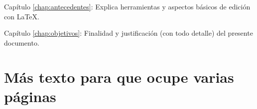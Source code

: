 \begin{definitionlist}
\item[Capítulo \ref{chap:antecedentes}: \nameref{chap:antecedentes}] Explica herramientas
  y aspectos básicos de edición con \LaTeX.
\item[Capítulo \ref{chap:objetivos}: \nameref{chap:objetivos}] Finalidad y justificación
  (con todo detalle) del presente documento.
\end{definitionlist}


\section{Más texto para que ocupe varias páginas}

\blindtext
\blinditemize[4]
\blindmathpaper


